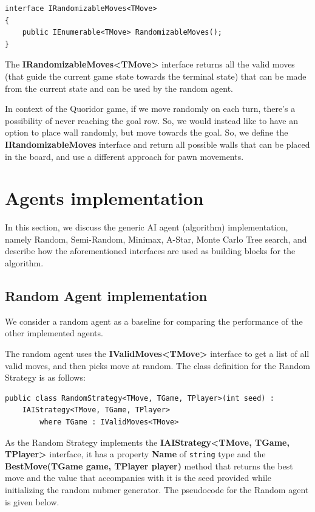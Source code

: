 \begin{lstlisting}
interface IRandomizableMoves<TMove>
{
    public IEnumerable<TMove> RandomizableMoves();
}
\end{lstlisting}
The \textbf{IRandomizableMoves\textless{}TMove\textgreater{}} interface returns all the valid moves (that guide the current game state towards the terminal state) that can be made from the current state and can be used by the random agent.

In context of the Quoridor game, if we move randomly on each turn, there's a possibility of never reaching the goal row. So, we would instead like to have an option to place wall randomly, but move towards the goal. So, we define the \textbf{IRandomizableMoves} interface and return all possible walls that can be placed in the board, and use a different approach for pawn movements.


\section{Agents implementation}

In this section, we discuss the generic \gls{AI} agent (algorithm) implementation, namely Random, Semi-Random, Minimax, A-Star, Monte Carlo Tree search, and describe how the aforementioned interfaces are used as building blocks for the algorithm.

\subsection{Random Agent implementation}
We consider a random agent as a baseline for comparing the performance of the other implemented agents. 

The random agent uses the \textbf{IValidMoves\textless{}TMove\textgreater{}} interface to get a list of all valid moves, and then picks move at random. The class definition for the Random Strategy is as follows:
\begin{lstlisting}
public class RandomStrategy<TMove, TGame, TPlayer>(int seed) :
    IAIStrategy<TMove, TGame, TPlayer>
        where TGame : IValidMoves<TMove>
\end{lstlisting}

As the Random Strategy implements the \textbf{IAIStrategy\textless{}TMove, TGame, TPlayer\textgreater{}} interface, it has a property \textbf{Name} of \texttt{string} type and the \textbf{BestMove(TGame game, TPlayer player)} method that returns the best move and the value that accompanies with it is the seed provided while initializing the random nubmer generator. The pseudocode for the Random agent is given below.

